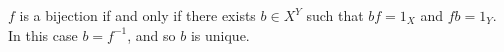 $f$ is a bijection if and only if there exists $b \in X^Y$ such that $b f = 1_X$ and $f b = 1_Y$. In this case $b = f^{-1}$, and so $b$ is unique.
